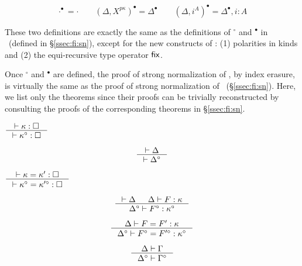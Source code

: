 \begin{definition}
\[ \cdot^\bullet = \cdot \qquad
        (\Delta,X^{p\kappa})^\bullet = \Delta^\bullet \qquad
        (\Delta,i^A)^\bullet = \Delta^\bullet,i:A
\]
\end{definition}
These two definitions are exactly the same as the definitions of
$^\circ$ and $^\bullet$ in \Fi\ (defined in \S\ref{ssec:fi:sn}),
except for the new constructs of \Fixi: (1) polarities in kinds and (2)
the equi-recursive type operator $\mathsf{fix}$.

Once $^\circ$ and $^\bullet$ are defined, the proof of strong normalization
of \Fixi, by index erasure, is virtually the same as the proof of
strong normalization of \Fi\ (\S\ref{ssec:fi:sn}). Here, we list only
the theorems since their proofs can be trivially reconstructed by consulting
the proofs of the corresponding theorems in \S\ref{ssec:fi:sn}.

\begin{theorem}
\label{thm:Fixierasesorting}
        $\inference{|- \kappa : \square}{|- \kappa^\circ : \square}$
\end{theorem}

\begin{theorem}
\label{thm:Fixierasetyctx}
\[ \inference{|- \Delta}{|- \Delta^\circ} \]
\end{theorem}

\begin{theorem}\label{thm:Fixierasekindeq}
$ \inference{|- \kappa=\kappa':\square}
        {|- \kappa^\circ=\kappa'^\circ:\square}
$
\end{theorem}

\begin{theorem}
\label{thm:Fixierasekinding}
\[ \inference{|- \Delta & \Delta |- F : \kappa}
                {\Delta^\circ |- F^\circ : \kappa^\circ}
\]
\end{theorem}
\begin{theorem}
\[ \inference{\Delta |- F=F':\kappa}
                {\Delta^\circ |- F^\circ=F'^\circ:\kappa^\circ}
\]
\label{thm:Fixierasetyconeq}
\end{theorem}

\begin{theorem}
\label{thm:Fixierasetmctx}
\[ \inference{\Delta |- \Gamma}{\Delta^\circ |- \Gamma^\circ} \]
\end{theorem}

